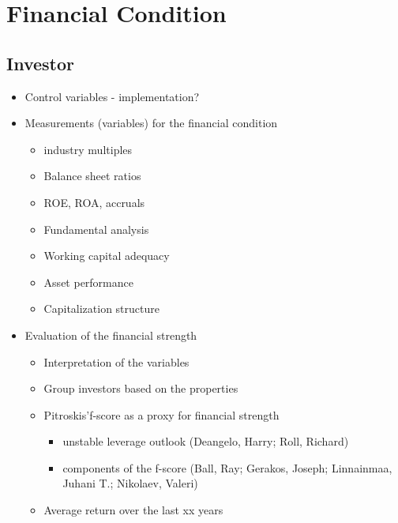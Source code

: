 \documentclass[12pt]{article}
\begin{document}
\section{Financial Condition}

\subsection{Investor}

    \begin{itemize}
        \item Control variables - implementation?
    
        \item Measurements (variables) for the financial condition 
    
            \begin{itemize}
            \item industry multiples
            \item Balance sheet ratios
            \item ROE, ROA, accruals 
            \item Fundamental analysis
            \item Working capital adequacy
            \item Asset performance
            \item Capitalization structure
            \end{itemize}
    
        \item Evaluation of the financial strength
    
            \begin{itemize}
            \item Interpretation of the variables
            \item Group investors based on the properties
            \item Pitroskis'f-score as a proxy for financial strength

            \begin{itemize}
                \item unstable leverage outlook (Deangelo, Harry; Roll, Richard)
                \item components of the f-score (Ball, Ray; Gerakos, Joseph; Linnainmaa, Juhani T.; Nikolaev, Valeri)
                
                
            \end{itemize}
            \item Average return over the last xx years 
            \end{itemize}

    
    \end{itemize}
\end{document}
